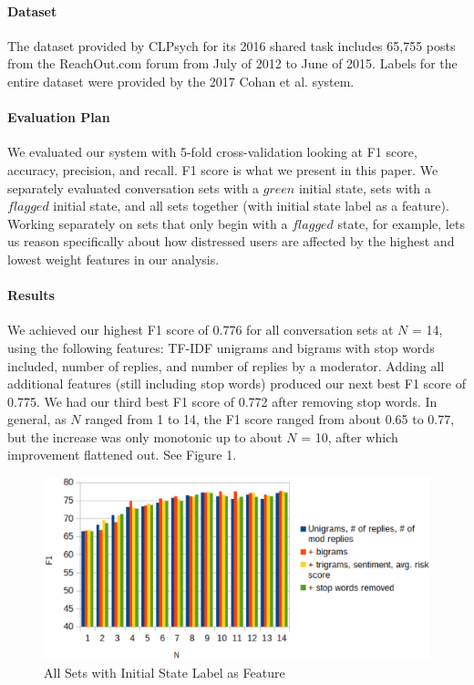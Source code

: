 \documentclass{article}
\begin{document}
\paragraph{Dataset}The dataset provided by CLPsych for its 2016 shared task includes 65,755 posts from the ReachOut.com forum from July of 2012 to June of 2015. Labels for the entire dataset were provided by the 2017 Cohan et al. system.

\paragraph{Evaluation Plan}We evaluated our system with 5-fold cross-validation looking at F1 score, accuracy, precision, and recall. F1 score is what we present in this paper. We separately evaluated conversation sets with a $green$ initial state, sets with a $flagged$ initial state, and all sets together (with initial state label as a feature). Working separately on sets that only begin with a $flagged$ state, for example, lets us reason specifically about how distressed users are affected by the highest and lowest weight features in our analysis.

\paragraph{Results}We achieved our highest F1 score of 0.776 for all conversation sets at $N$ = 14, using the following features: TF-IDF unigrams and bigrams with stop words included, number of replies, and number of replies by a moderator. Adding all additional features (still including stop words) produced our next best F1 score of 0.775. We had our third best F1 score of 0.772 after removing stop words. In general, as $N$ ranged from 1 to 14, the F1 score ranged from about 0.65 to 0.77, but the increase was only monotonic up to about $N$ = 10, after which improvement flattened out. See Figure 1.

\begin{figure}[h!]
    \includegraphics[width=14cm]{resultsAll}
    \caption{All Sets with Initial State Label as Feature}
\end{figure}
\end{document}
